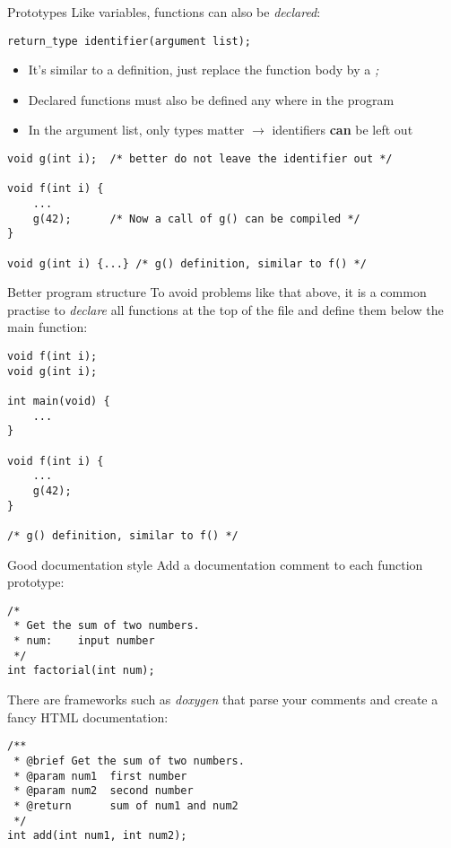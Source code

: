 \begin{frame}[fragile]{Prototypes}
	Like variables, functions can also be \textit{declared}:
	\begin{lstlisting}[numbers=none,basicstyle=\itshape\footnotesize]
return_type identifier(argument list);
\end{lstlisting}
	\begin{itemize}
		\item It's similar to a definition, just replace the function body by a \textit{;}
		\item Declared functions must also be defined any where in the program
		\item In the argument list, only types matter $\rightarrow$ identifiers \textbf{can} be left out
	\end{itemize}
	\begin{lstlisting}
void g(int i);	/* better do not leave the identifier out */

void f(int i) {
	...
	g(42);		/* Now a call of g() can be compiled */
}

void g(int i) {...}	/* g() definition, similar to f() */
\end{lstlisting}
\end{frame}

\begin{frame}[fragile]{Better program structure}
	To avoid problems like that above, it is a common practise to \textit{declare} all functions at the top of the file and define them below the main function:
	\begin{lstlisting}
void f(int i);
void g(int i);

int main(void) {
	...
}

void f(int i) {
	...
	g(42);
}

/* g() definition, similar to f() */
\end{lstlisting}
\end{frame}

\begin{frame}[fragile]{Good documentation style}
    Add a documentation comment to each function prototype:
    \begin{lstlisting}
/*
 * Get the sum of two numbers.
 * num:    input number
 */
int factorial(int num);
\end{lstlisting}
    There are frameworks such as \emph{doxygen} that parse your comments and
    create a fancy HTML documentation:
    \begin{lstlisting}[escapeinside={}]
/**
 * @brief Get the sum of two numbers.
 * @param num1  first number
 * @param num2  second number
 * @return      sum of num1 and num2
 */
int add(int num1, int num2);
\end{lstlisting}
\end{frame}

